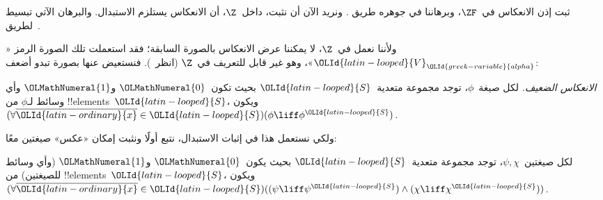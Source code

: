 \documentclass[../../../include/open-logic-section]{subfiles}
\begin{document}
ثبت إذن الانعكاس في~$\ZF$، وبرهاننا في جوهره طريق
\citet{Montague1961}. ونريد الآن أن نثبت، داخل~$\Z$، أن الانعكاس
يستلزم الاستبدال. والبرهان الآتي تبسيط لطريق~\citet{Levy1960}.

ولأننا نعمل في~$\Z$، لا يمكننا عرض الانعكاس بالصورة السابقة؛ فقد
استعملت تلك الصورة الرمز «${\OLId{latin-looped}{V}}_{\OLId{greek-variable}{alpha}}$»، وهو غير قابل للتعريف في~$\Z$
(انظر~). فنستعيض عنها بصورة تبدو أضعف:

\begin{defish}
\emph{الانعكاس الضعيف.} لكل صيغة~$\phi$، توجد مجموعة متعدية~${\OLId{latin-looped}{S}}$ بحيث
تكون~${\OLMathNumeral{0}}$ و${\OLMathNumeral{1}}$ وأي وسائط لـ$\phi$ من !!{element}s~${\OLId{latin-looped}{S}}$، ويكون
$(\forall \overline{{\OLId{latin-ordinary}{x}}} \in {\OLId{latin-looped}{S}})(\phi \liff \phi^{\OLId{latin-looped}{S}})$.
\end{defish}

ولكي نستعمل هذا في إثبات الاستبدال، نتبع أولًا
\citet[first part of Theorem 2]{Levy1960} ونثبت إمكان «عكس» صيغتين
معًا:

\begin{lem}
لكل صيغتين~$\psi, \chi$، توجد مجموعة متعدية~${\OLId{latin-looped}{S}}$ بحيث يكون~${\OLMathNumeral{0}}$ و${\OLMathNumeral{1}}$
(وأي وسائط للصيغتين) من !!{element}s~${\OLId{latin-looped}{S}}$، ويكون
$(\forall \overline{{\OLId{latin-ordinary}{x}}} \in {\OLId{latin-looped}{S}})((\psi \liff \psi^{\OLId{latin-looped}{S}}) \land (\chi
\liff \chi^{\OLId{latin-looped}{S}}))$.
\end{lem}
\end{document}
